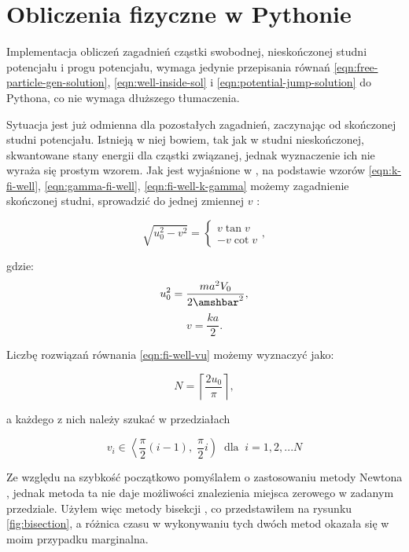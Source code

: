 \documentclass{SGGW-thesis}
\begin{document}
	
	
	\section{Obliczenia fizyczne w Pythonie}
		Implementacja obliczeń zagadnień cząstki swobodnej, nieskończonej studni potencjału i progu potencjału, wymaga jedynie przepisania równań \ref{eqn:free-particle-gen-solution}, \ref{eqn:well-inside-sol} i \ref{eqn:potential-jump-solution} do Pythona, co nie wymaga dłuższego tłumaczenia.
		
		Sytuacja jest już odmienna dla pozostałych zagadnień, zaczynając od skończonej studni potencjału. Istnieją w niej bowiem, tak jak w studni nieskończonej, skwantowane stany energii dla cząstki związanej, jednak wyznaczenie ich nie wyraża się prostym wzorem. Jak jest wyjaśnione w \cite{wikipedia-well}, na podstawie wzorów \ref{eqn:k-fi-well}, \ref{eqn:gamma-fi-well}, \ref{eqn:fi-well-k-gamma} możemy zagadnienie skończonej studni, sprowadzić do jednej zmiennej $v$ :
		
		\begin{equation}\label{eqn:fi-well-vu}
			\sqrt{u_0^2-v^2} = 
			\left\{
		\begin{matrix}
			v\tan v \\ -v\cot v 
		\end{matrix}\right. ,
		\end{equation}
		
gdzie:
	\[u_0^2=\frac{ma^2V_0}{2\amshbar^2},\]
	\[v=\frac{ka}{2}.\]
		
Liczbę rozwiązań równania \ref{eqn:fi-well-vu} możemy wyznaczyć jako:

	\begin{equation}
	N = \left \lceil \frac{2u_0}{\pi} \right \rceil,
	\end{equation}
	
a każdego z nich należy szukać w przedziałach

	\begin{equation}\label{v-range}
	v_i \in \left< \frac{\pi}{2}(i-1), \; \frac{\pi}{2}i \right) \;\; \textrm{dla} \; \; i = 1, 2, ... N
	\end{equation}
	
	Ze względu na szybkość początkowo pomyślałem o zastosowaniu metody Newtona \cite{newton-method}, jednak metoda ta nie daje możliwości znalezienia miejsca zerowego w zadanym przedziale. Użyłem więc metody bisekcji \cite{bisection-method}, co przedstawiłem na rysunku \ref{fig:bisection}, a różnica czasu w wykonywaniu tych dwóch metod okazała się w moim przypadku marginalna.
		
\end{document}
